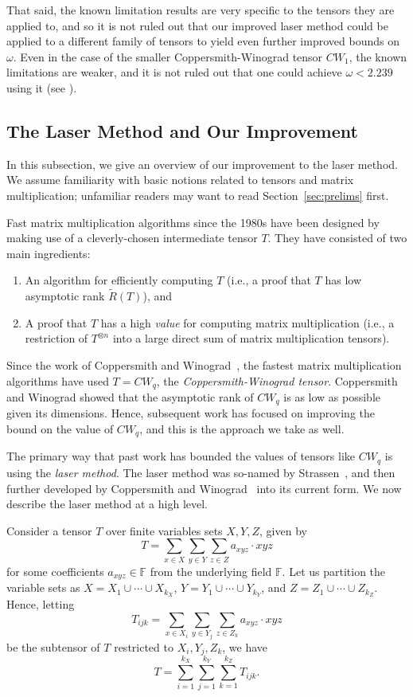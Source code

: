 \documentclass{theoretics}
\newcommand{\F}{\mathbb{F}}
\begin{document}
That said, the known limitation results are very specific to the tensors they are applied to, and so it is not ruled out that our improved laser method could be applied to a different family of tensors to yield even further improved bounds on $\omega$.
Even in the case of the smaller Coppersmith-Winograd tensor $CW_1$, the known limitations are weaker, and it is not ruled out that one could achieve $\omega<2.239$ using it (see \cite[Table 1]{ambainis}). 


\subsection{The Laser Method and Our Improvement}

In this subsection, we give an overview of our improvement to the laser method. We assume familiarity with basic notions related to tensors and matrix multiplication; unfamiliar readers may want to read Section~\ref{sec:prelims} first.

Fast matrix multiplication algorithms since the 1980s have been designed by making use of a cleverly-chosen intermediate tensor $T$. They have consisted of two main ingredients:
\begin{enumerate}
    \item An algorithm for efficiently computing $T$ (i.e., a proof that $T$ has low asymptotic rank $\tilde{R}(T)$), and
    \item A proof that $T$ has a high \emph{value} for computing matrix multiplication (i.e., a restriction of $T^{\otimes n}$ into a large direct sum of matrix multiplication tensors).
\end{enumerate}
Since the work of Coppersmith and Winograd~\cite{coppersmith}, the fastest matrix multiplication algorithms have used $T=CW_q$, the \emph{Coppersmith-Winograd tensor}. Coppersmith and Winograd showed that the asymptotic rank of $CW_q$ is as low as possible given its dimensions. Hence, subsequent work has focused on improving the bound on the value of $CW_q$, and this is the approach we take as well.

The primary way that past work has bounded the values of tensors like $CW_q$ is using the \emph{laser method}. The laser method was so-named by Strassen~\cite{strassenlaser1}, and then further developed by Coppersmith and Winograd~\cite{coppersmith} into its current form. We now describe the laser method at a high level.

Consider a tensor $T$ over finite variables sets $X,Y,Z$, given by $$T = \sum_{x \in X} \sum_{y \in Y} \sum_{z \in Z} a_{xyz} \cdot x y z$$ for some coefficients $a_{xyz} \in \F$ from the underlying field $\F$. Let us partition the variable sets as $X = X_1 \cup \cdots \cup X_{k_X}$, $Y = Y_1 \cup \cdots \cup Y_{k_Y}$, and $Z = Z_1 \cup \cdots \cup Z_{k_Z}$. Hence, letting $$T_{ijk} = \sum_{x \in X_i} \sum_{y \in Y_j} \sum_{z \in Z_k} a_{xyz} \cdot x y z$$ be the subtensor of $T$ restricted to $X_i,Y_j,Z_k$, we have $$T = \sum_{i=1}^{k_X} \sum_{j=1}^{k_Y} \sum_{k=1}^{k_Z} T_{ijk}.$$
\end{document}
